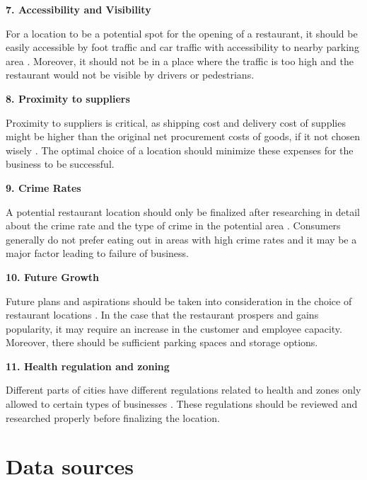 \documentclass[a4paper, 11pt, oneside]{Thesis}  %
\begin{document}
\textbf{7.	Accessibility and Visibility}

For a location to be a potential spot for the opening of a restaurant, it should be easily accessible by foot traffic and car traffic with accessibility to nearby parking area \cite{Webstaurantstore.com.25.07.2018}. Moreover, it should not be in a place where the traffic is too high and the restaurant would not be visible by drivers or pedestrians.

\textbf{8.	Proximity to suppliers}

Proximity to suppliers is critical, as shipping cost and delivery cost of supplies might be higher than the original net procurement costs of goods, if it not chosen wisely \cite{Webstaurantstore.com.25.07.2018}. The optimal choice of a location should minimize these expenses for the business to be successful.

\textbf{9.	Crime Rates}

A potential restaurant location should only be finalized after researching in detail about the crime rate and the type of crime in the potential area \cite{Webstaurantstore.com.25.07.2018}. Consumers generally do not prefer eating out in areas with high crime rates and it may be a major factor leading to failure of business. 

\textbf{10.	Future Growth}

Future plans and aspirations should be taken into consideration in the choice of restaurant locations \cite{Webstaurantstore.com.25.07.2018}. In the case that the restaurant prospers and gains popularity, it may require an increase in the customer and employee capacity. Moreover, there should be sufficient parking spaces and storage options.

\textbf{11.	Health regulation and zoning}

Different parts of cities have different regulations related to health and zones only allowed to certain types of businesses \cite{Webstaurantstore.com.25.07.2018}. These regulations should be reviewed and researched properly before finalizing the location. 




\chapter{Data sources}
\end{document}
